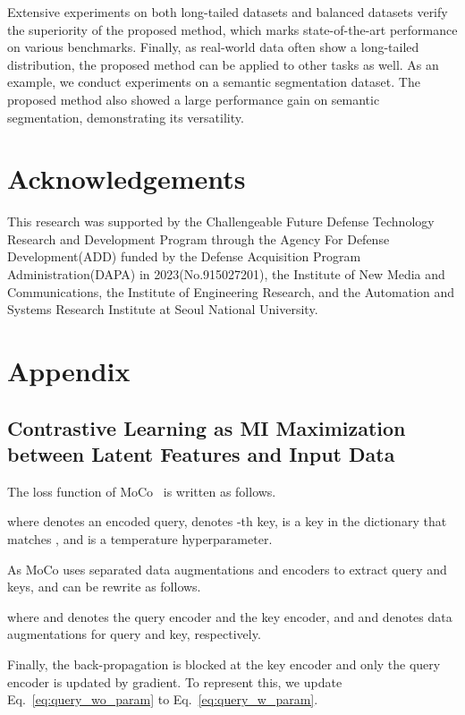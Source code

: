 \documentclass{article}
\theoremstyle{plain}
\theoremstyle{definition}
\theoremstyle{remark}
\begin{document}
Extensive experiments on both long-tailed datasets and balanced datasets verify the superiority of the proposed method, which marks state-of-the-art performance on various benchmarks. Finally, as real-world data often show a long-tailed distribution, the proposed method can be applied to other tasks as well. As an example, we conduct experiments on a semantic segmentation dataset. The proposed method also showed a large performance gain on semantic segmentation, demonstrating its versatility. \section*{Acknowledgements}
This research was supported by the Challengeable Future Defense Technology Research and Development Program through the Agency For Defense Development(ADD) funded by the Defense Acquisition Program Administration(DAPA) in 2023(No.915027201), the Institute of New Media and Communications, the Institute of Engineering Research, and the Automation and Systems Research Institute at Seoul National University. 




\newpage
\appendix
\onecolumn

\setcounter{table}{0}
\renewcommand{\thetable}{A.\arabic{table}}
\setcounter{equation}{0}
\renewcommand{\theequation}{A.\arabic{equation}}

\section{Appendix}
\subsection{Contrastive Learning as MI Maximization between Latent Features and Input Data} \label{sec:detailed_contrastive_formulation}

The loss function of MoCo~\cite{he2020momentum} is written as follows.

where  denotes an encoded query,  denotes -th key,  is a key in the dictionary that matches , and  is a temperature hyperparameter.

As MoCo uses separated data augmentations and encoders to extract query and keys,  and  can be rewrite as follows.

where  and  denotes the query encoder and the key encoder, and  and  denotes data augmentations for query and key, respectively.

Finally, the back-propagation is blocked at the key encoder and only the query encoder is updated by gradient. To represent this, we update Eq.~\ref{eq:query_wo_param} to Eq.~\ref{eq:query_w_param}.
\end{document}
